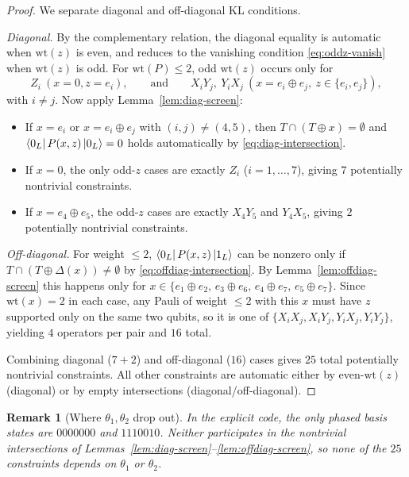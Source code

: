 \documentclass[11pt]{article}
\newtheorem{remark}{Remark}
\begin{document}
\begin{proof}
We separate diagonal and off-diagonal KL conditions.

\smallskip
\noindent\emph{Diagonal.}
By the complementary relation, the diagonal equality is automatic when $\mathrm{wt}(z)$ is even, and reduces to the vanishing
condition \eqref{eq:oddz-vanish} when $\mathrm{wt}(z)$ is odd.
For $\mathrm{wt}(P)\le 2$, odd $\mathrm{wt}(z)$ occurs only for
\[
Z_i\ (x=0,z=e_i),\qquad\text{and}\qquad X_iY_j,\ Y_iX_j\ (x=e_i\oplus e_j,\ z\in\{e_i,e_j\}),
\]
with $i\neq j$.
Now apply Lemma~\ref{lem:diag-screen}:
\begin{itemize}
\item If $x=e_i$ or $x=e_i\oplus e_j$ with $(i,j)\neq(4,5)$, then $T\cap(T\oplus x)=\emptyset$ and
$\bra{0_L}P(x,z)\ket{0_L}=0$ holds automatically by \eqref{eq:diag-intersection}.
\item If $x=0$, the only odd-$z$ cases are exactly $Z_i$ ($i=1,\dots,7$), giving $7$ potentially nontrivial constraints.
\item If $x=e_4\oplus e_5$, the odd-$z$ cases are exactly $X_4Y_5$ and $Y_4X_5$, giving $2$ potentially nontrivial constraints.
\end{itemize}

\smallskip
\noindent\emph{Off-diagonal.}
For weight $\le 2$, $\bra{0_L}P(x,z)\ket{1_L}$ can be nonzero only if
$T\cap(T\oplus\Delta(x))\neq\emptyset$ by \eqref{eq:offdiag-intersection}.
By Lemma~\ref{lem:offdiag-screen} this happens only for
$x\in\{e_1\oplus e_2,\,e_3\oplus e_6,\,e_4\oplus e_7,\,e_5\oplus e_7\}$.
Since $\mathrm{wt}(x)=2$ in each case, any Pauli of weight $\le 2$ with this $x$ must have $z$ supported only on the same two qubits,
so it is one of $\{X_iX_j,X_iY_j,Y_iX_j,Y_iY_j\}$, yielding $4$ operators per pair and $16$ total.

\smallskip
Combining diagonal ($7+2$) and off-diagonal ($16$) cases gives $25$ total potentially nontrivial constraints.
All other constraints are automatic either by even-$\mathrm{wt}(z)$ (diagonal) or by empty intersections (diagonal/off-diagonal).
\end{proof}

\begin{remark}[Where $\theta_1,\theta_2$ drop out]
In the explicit code, the only phased basis states are $0000000$ and $1110010$.
Neither participates in the nontrivial intersections of Lemmas~\ref{lem:diag-screen}--\ref{lem:offdiag-screen},
so none of the $25$ constraints depends on $\theta_1$ or $\theta_2$.
\end{remark}
\end{document}
